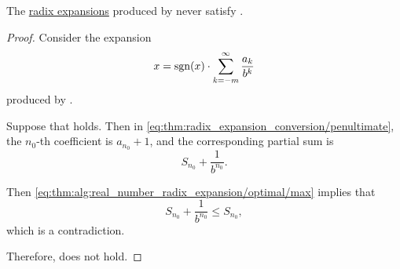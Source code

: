 \begin{lemma}\label{thm:real_number_radix_expansion_zeros}
  The \hyperref[def:real_number_radix_expansion]{radix expansions} produced by  never satisfy .
\end{lemma}
\begin{proof}
  Consider the expansion
  \begin{equation*}
    x = \operatorname{sgn}(x) \cdot \sum_{k=-m}^\infty \frac {a_k} {b^k}
  \end{equation*}
  produced by .

  Suppose that  holds. Then  in \eqref{eq:thm:radix_expansion_conversion/penultimate}, the \( n_0 \)-th coefficient is \( a_{n_0} + 1 \), and the corresponding partial sum is
  \begin{equation*}
    S_{n_0} + \frac 1 {b^{n_0}}.
  \end{equation*}

  Then \eqref{eq:thm:alg:real_number_radix_expansion/optimal/max} implies that
  \begin{equation*}
    S_{n_0} + \frac 1 {b^{n_0}} \leq S_{n_0},
  \end{equation*}
  which is a contradiction.

  Therefore,  does not hold.
\end{proof}


